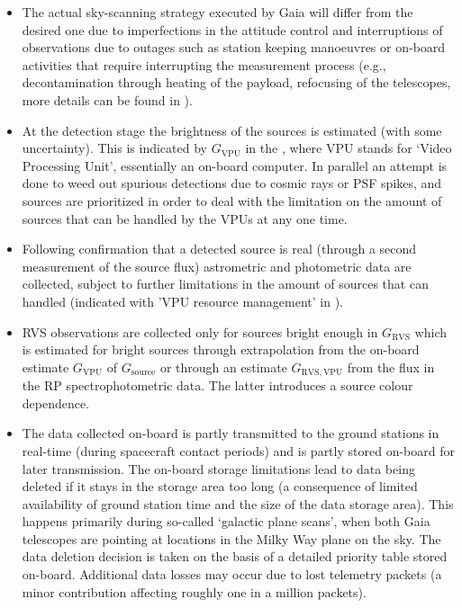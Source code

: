 \begin{itemize}
    \item The actual sky-scanning strategy executed by Gaia will differ from the desired one due to imperfections in the attitude control and interruptions of observations due to outages such as station keeping manoeuvres or on-board activities that require interrupting the measurement process (e.g., decontamination through heating of the payload, refocusing of the telescopes, more details can be found in \cite{2016A&A...595A...1G}).
    \item At the detection stage the brightness of the sources is estimated (with some uncertainty). This is indicated by $G_\mathrm{VPU}$ in the , where VPU stands for `Video Processing Unit', essentially an on-board computer. In parallel an attempt is done to weed out spurious detections due to cosmic rays or PSF spikes, and sources are prioritized in order to deal with the limitation on the amount of sources that can be handled by the VPUs at any one time.
    \item Following confirmation that a detected source is real (through a second measurement of the source flux) astrometric and photometric data are collected, subject to further limitations in the amount of sources that can handled (indicated with 'VPU resource management' in ).
    \item RVS observations are collected only for sources bright enough in $G_\mathrm{RVS}$ which is estimated for bright sources through extrapolation from the on-board estimate $G_\mathrm{VPU}$ of $G_\mathrm{source}$ or through an estimate $G_\mathrm{RVS,VPU}$ from the flux in the RP spectrophotometric data. The latter introduces a source colour dependence.
    \item The data collected on-board is partly transmitted to the ground stations in real-time (during spacecraft contact periods) and is partly stored on-board for later transmission. The on-board storage limitations lead to data being deleted if it stays in the storage area too long (a consequence of limited availability of ground station time and the size of the data storage area). This happens primarily during so-called `galactic plane scans', when both Gaia telescopes are pointing at locations in the Milky Way plane on the sky. The data deletion decision is taken on the basis of a detailed priority table stored on-board. Additional data losses may occur due to lost telemetry packets (a minor contribution affecting roughly one in a million packets).
\end{itemize}

